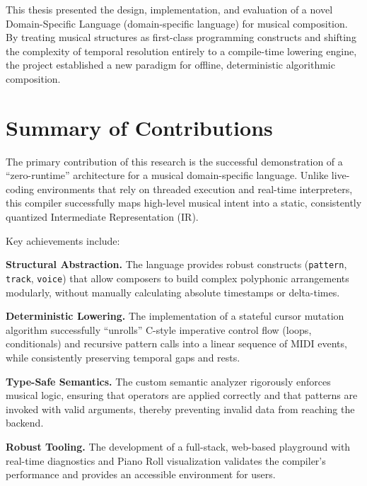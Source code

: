 

This thesis presented the design, implementation, and evaluation of a novel Domain-Specific Language
(domain-specific language) for musical
composition.
By treating musical structures as first-class programming constructs and shifting the complexity of temporal resolution
entirely to a compile-time lowering engine, the project established a new paradigm for offline, deterministic
algorithmic composition.

\section{Summary of Contributions}\label{detail-sec:summary-of-contributions}

The primary contribution of this research is the successful demonstration of a ``zero-runtime'' architecture for a
musical domain-specific language\@.
Unlike live-coding environments that rely on threaded execution and real-time interpreters, this compiler successfully
maps high-level musical intent into a static, consistently quantized Intermediate Representation (IR).

Key achievements include:

\noindent \textbf{Structural Abstraction.} The language provides robust constructs (\texttt{pattern}, \texttt{track},
\texttt{voice}) that allow composers to build complex polyphonic arrangements modularly, without manually
calculating absolute timestamps or delta-times.

\noindent \textbf{Deterministic Lowering.} The implementation of a stateful cursor mutation algorithm successfully
``unrolls'' C-style imperative control flow (loops, conditionals) and recursive pattern calls into a linear sequence
of MIDI events, while consistently preserving temporal gaps and rests.

\noindent \textbf{Type-Safe Semantics.} The custom semantic analyzer rigorously enforces musical logic, ensuring that
operators are applied correctly and that patterns are invoked with valid arguments, thereby preventing invalid data
from reaching the backend.

\noindent \textbf{Robust Tooling.} The development of a full-stack, web-based playground with real-time diagnostics and
Piano Roll visualization validates the compiler's performance and provides an accessible environment for users.

